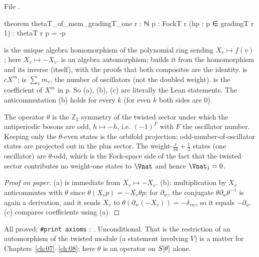 \noindent File .
\begin{leancode}
theorem thetaT_of_mem_gradingT_one {r : ℕ} {p : FockT r} (hp : p ∈ gradingT r 1) :
    thetaT r p = -p
\end{leancode}
\begin{dictionary}
 is the unique algebra homomorphism of the polynomial ring sending $X_v\mapsto f(v)$;
here $X_v\mapsto -X_v$.   is an algebra automorphism;  builds it
from the homomorphism and its inverse (itself), with the proofs that both composites are the
identity.   is $cX^m$;  is $\sum_v m_v$, the number of
oscillators (not the doubled weight).   is the coefficient of $X^m$ in $p$.  So (a),
(b), (c) are literally the Lean statements.  The anticommutation (b) holds for every $k$ (for even
$k$ both sides are $0$).
\end{dictionary}

\begin{physics}
The operator $\theta$ is the $\mathbb Z_2$ symmetry of the twisted sector under which the antiperiodic bosons are odd, $h\mapsto-h$, i.e. $(-1)^{F}$ with $F$ the oscillator number. Keeping only the $\theta$-even states is the orbifold projection: odd-number-of-oscillator states are projected out in the plus sector. The weight-$\tfrac{r}{16}+\tfrac12$ states (one oscillator) are $\theta$-odd, which is the Fock-space side of the fact that the twisted sector contributes no weight-one states to $\Vnat$ and hence $\Vnat_1=0$.
\end{physics}
\begin{proof}[Proof on paper]
(a) is immediate from $X_v\mapsto-X_v$.  (b): multiplication by $X_v$ anticommutes with $\theta$
since $\theta(X_vp)=-X_v\theta p$; for $\partial_w$, the conjugate $\theta\partial_w\theta^{-1}$ is again a derivation,
and it sends $X_v$ to $\theta(\partial_w(-X_v))=-\delta_{vw}$, so it equals $-\partial_w$.  (c) compares
coefficients using (a).
\end{proof}
\begin{status}
All proved; \texttt{\#print axioms} : .  Unconditional.  That  is the restriction of an
automorphism of the twisted module (a statement involving $V$) is a matter for
Chapters~\ref{ch:07}--\ref{ch:08}; here $\theta$ is an operator on $S[\theta]$ alone.
\end{status}

